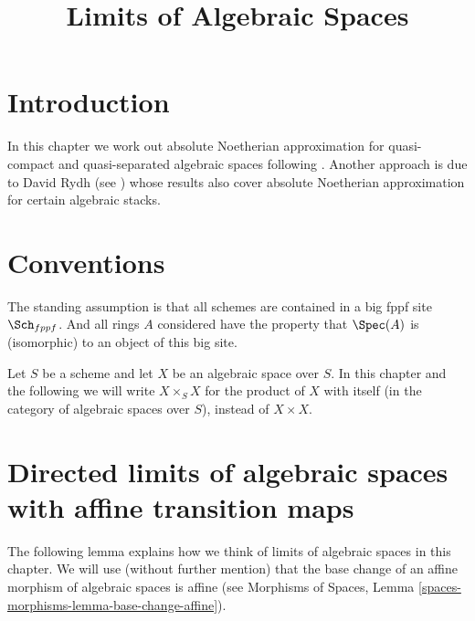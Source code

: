 

%


\title{Limits of Algebraic Spaces}


\maketitle

\label{section-phantom}

\tableofcontents

\section{Introduction}
\label{section-introduction}

\noindent
In this chapter we work out absolute Noetherian approximation for
quasi-compact and quasi-separated algebraic spaces following
\cite{CLO}. Another approach is due to David Rydh (see
\cite{rydh_approx}) whose results
also cover absolute Noetherian approximation for certain algebraic stacks.


\section{Conventions}
\label{section-conventions}

\noindent
The standing assumption is that all schemes are contained in
a big fppf site $\Sch_{fppf}$. And all rings $A$ considered
have the property that $\Spec(A)$ is (isomorphic) to an
object of this big site.

\medskip\noindent
Let $S$ be a scheme and let $X$ be an algebraic space over $S$.
In this chapter and the following we will write $X \times_S X$
for the product of $X$ with itself (in the category of algebraic
spaces over $S$), instead of $X \times X$.




\section{Directed limits of algebraic spaces with affine transition maps}
\label{section-limits}

\noindent
The following lemma explains how we think of limits of algebraic
spaces in this chapter. We will use (without further mention) that the
base change of an affine morphism of algebraic spaces is affine (see
Morphisms of Spaces, Lemma \ref{spaces-morphisms-lemma-base-change-affine}).

